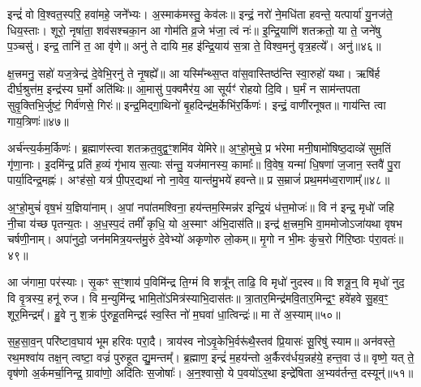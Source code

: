 {\anuvakamend[{प्र॒ति॒ष्ठाम॑ह्व॒दस्तु॑ वि॒द्युतं॑ वस॒न्तमे॒वेन्द्र॑स्या॒\-ऽष्टात्रिꣳ॑शच्च॥11॥}]}

इन्द्रं॑ वो वि॒श्वत॒स्परि॒ हवा॑महे॒ जने᳚भ्यः। अ॒स्माक॑मस्तु॒ केव॑लः॥ इन्द्रं॒ नरो॑ ने॒मधि॑ता हवन्ते॒ यत्पार्या॑ यु॒नज॑ते॒ धिय॒स्ताः। शूरो॒ नृषा॑ता॒ शव॑सश्चका॒न आ गोम॑ति व्र॒जे भ॑जा॒ त्वं नः॑॥ इ॒न्द्रि॒याणि॑ शतक्रतो॒ या ते॒ जने॑षु प॒ञ्चसु॑। इन्द्र॒ तानि॑ त॒ आ वृ॑णे॥ अनु॑ ते दायि म॒ह इ॑न्द्रि॒याय॑ स॒त्रा ते॒ विश्व॒मनु॑ वृत्र॒हत्ये᳚। अनु॑॥४६॥

क्ष॒त्त्रमनु॒ सहो॑ यज॒त्रेन्द्र॑ दे॒वेभि॒रनु॑ ते नृ॒षह्ये᳚॥ आ यस्मि᳚न्थ्स॒प्त वा॑स॒वास्तिष्ठ॑न्ति स्वा॒रुहो॑ यथा। ऋषि॑र्\mbox{}ह दीर्घ॒श्रुत्त॑म॒ इन्द्र॑स्य घ॒र्मो अति॑थिः॥ आ॒मासु॑ प॒क्वमैर॑य॒ आ सूर्यꣳ॑ रोहयो दि॒वि। घ॒र्मं न साम॑न्तपता सुवृ॒क्तिभि॒र्जुष्टं॒ गिर्व॑णसे॒ गिरः॑॥ इन्द्र॒मिद्गा॒थिनो॑ बृ॒हदिन्द्र॑म॒र्केभि॑र॒र्किणः॑। इन्द्रं॒ वाणी॑रनूषत॥ गाय॑न्ति त्वा गाय॒त्रिणः॑॥४७॥

अर्च॑न्त्य॒र्कम॒र्किणः॑। ब्र॒ह्माण॑स्त्वा शतक्रत॒वुद्व॒ꣳ॒शमि॑व येमिरे॥ अ॒ꣳ॒हो॒मुचे॒ प्र भ॑रेमा मनी॒षामो॑षिष्ठ॒दाव्न्ने॑ सुम॒तिं गृ॑णा॒नाः। इ॒दमि॑न्द्र॒ प्रति॑ ह॒व्यं गृ॑भाय स॒त्याः स॑न्तु॒ यज॑मानस्य॒ कामाः᳚॥ वि॒वेष॒ यन्मा॑ धि॒षणा॑ ज॒जान॒ स्तवै॑ पु॒रा पार्या॒दिन्द्र॒मह्नः॑। अꣳह॑सो॒ यत्र॑ पी॒पर॒द्यथा॑ नो ना॒वेव॒ यान्त॑मु॒भये॑ हवन्ते॥ प्र स॒म्राजं॑ प्रथ॒मम॑ध्व॒राणाम्᳚॥४८॥

अ॒ꣳ॒हो॒मुचं॑ वृष॒भं य॒ज्ञिया॑नाम्। अ॒पां नपा॑तमश्विना॒ हय॑न्तम॒स्मिन्न॑र इन्द्रि॒यं ध॑त्त॒मोजः॑॥ वि न॑ इन्द्र॒ मृधो॑ जहि नी॒चा य॑च्छ पृतन्य॒तः। अ॒ध॒स्प॒दं तमीं᳚ कृधि॒ यो अ॒स्माꣳ अ॑भि॒दास॑ति॥ इन्द्र॑ क्ष॒त्त्रम॒भि वा॒ममोजो\-ऽजा॑यथा वृषभ चर्\mbox{}षणी॒नाम्। अपा॑नुदो॒ जन॑ममित्र॒यन्त॑मु॒रुं दे॒वेभ्यो॑ अकृणोरु लो॒कम्॥ मृ॒गो न भी॒मः कु॑च॒रो गि॑रि॒ष्ठाः प॑रा॒वतः॑॥४९॥

आ ज॑गामा॒ पर॑स्याः। सृ॒कꣳ स॒ꣳ॒शाय॑ प॒विमि॑न्द्र ति॒ग्मं वि शत्रू᳚न् ताढि॒ वि मृधो॑ नुदस्व॥ वि शत्रू॒न्॒ वि मृधो॑ नुद॒ वि वृ॒त्रस्य॒ हनू॑ रुज। वि म॒न्युमि॑न्द्र भामि॒तो॑\-ऽमित्र॑स्याभि॒दास॑तः॥ त्रा॒तार॒मिन्द्र॑मवि॒तार॒मिन्द्र॒ꣳ॒ हवे॑हवे सु॒हव॒ꣳ॒ शूर॒मिन्द्रम्᳚। हु॒वे नु श॒क्रं पु॑रुहू॒तमिन्द्रꣴ॑ स्व॒स्ति नो॑ म॒घवा॑ धा॒त्विन्द्रः॑॥ मा ते॑ अ॒स्याम्॥५०॥

स॒ह॒सा॒व॒न् परि॑ष्टाव॒घाय॑ भूम हरिवः परा॒दै। त्राय॑स्व नो\-ऽवृ॒केभि॒र्वरू॑थै॒स्तव॑ प्रि॒यासः॑ सू॒रिषु॑ स्याम॥ अन॑वस्ते॒ रथ॒मश्वा॑य तक्ष॒न् त्वष्टा॒ वज्रं॑ पुरुहूत द्यु॒मन्तम्᳚। ब्र॒ह्माण॒ इन्द्रं॑ म॒हय॑न्तो अ॒र्कैरव॑र्धय॒न्नह॑ये॒ हन्त॒वा उ॑॥ वृष्णे॒ यत् ते॒ वृष॑णो अ॒र्कमर्चा॒निन्द्र॒ ग्रावा॑णो॒ अदि॑तिः स॒जोषाः᳚। अ॒न॒श्वासो॒ ये प॒वयो॑\-ऽर॒था इन्द्रे॑षिता अ॒भ्यव॑र्तन्त॒ दस्यून्॑॥५१॥

